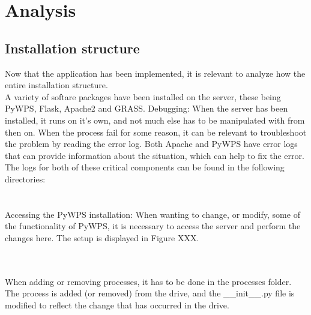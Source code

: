 
\chapter{Analysis} %

\label{ch:architecture} %


\section{Installation structure}

Now that the application has been implemented, it is relevant to analyze how the entire installation structure. \\

A variety of softare packages have been installed on the server, these being PyWPS, Flask, Apache2 and GRASS.
Debugging: When the server has been installed, it runs on it's own, and not much else has to be manipulated with from then on. When the process fail for some reason, it can be relevant to troubleshoot the problem by reading the error log. Both Apache and PyWPS have error logs that can provide information about the situation, which can help to fix the error. The logs for both of these critical components can be found in the following directories:\\


\\
\\

Accessing the PyWPS installation: When wanting to change, or modify, some of the functionality of PyWPS, it is necessary to access the server and perform the changes here. The setup is displayed in Figure XXX. 


\\
\\

When adding or removing processes, it has to be done in the processes folder. The process is added (or removed) from the drive, and the \_\_init\_\_.py file is modified to reflect the change that has occurred in the drive.

